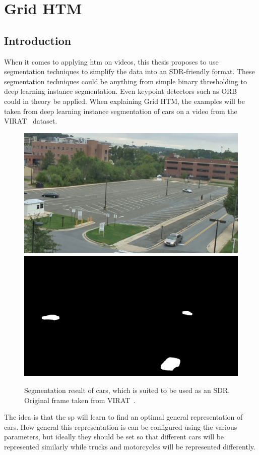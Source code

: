 \chapter{Grid HTM}
\label{sec:grid_htm}
\section{Introduction}
When it comes to applying \gls*{htm} on videos, this thesis proposes to use segmentation techniques to simplify the data into an SDR-friendly format. These segmentation techniques could be anything from simple binary thresholding to deep learning instance segmentation. Even keypoint detectors such as ORB~\cite{orb_detector} could in theory be applied. When explaining Grid HTM, the examples will be taken from deep learning instance segmentation of cars on a video from the VIRAT~\cite{VIRAT} dataset.
\begin{figure}[H]
    \centering
    \includegraphics[width=.45\textwidth]{resources/methodology/original.png}
    \includegraphics[width=.45\textwidth]{resources/methodology/car_segmentation.png}
    \caption{Segmentation result of cars, which is suited to be used as an SDR. Original frame taken from VIRAT~\cite{VIRAT}.}
\end{figure}
The idea is that the \gls*{sp} will learn to find an optimal general representation of cars. How general this representation is can be configured using the various parameters, but ideally they should be set so that different cars will be represented similarly while trucks and motorcycles will be represented differently.
